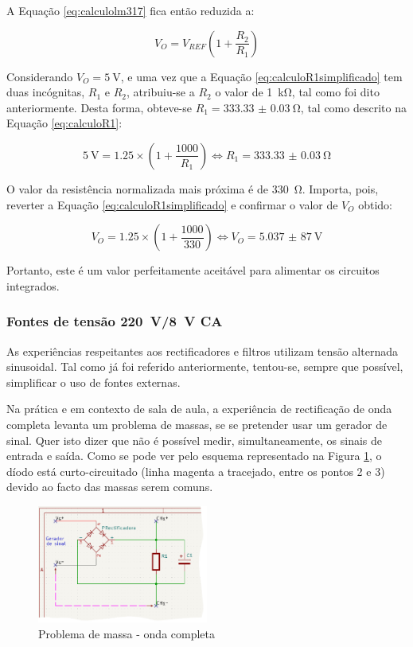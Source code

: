 A Equação \ref{eq:calculolm317} fica então reduzida a:

\begin{equation} \label{eq:calculoR1simplificado}
	V_{O} = V_{REF} (1 + \frac{R_{2}}{R_{1}})
\end{equation}

Considerando $V_{O} = \SI{5}{\volt}$, e uma vez que a Equação \ref{eq:calculoR1simplificado} tem duas incógnitas, $R_{1}$ e $R_{2}$, atribuiu-se a $R_{2}$ o valor de \SI{1}{\kilo\ohm}, tal como foi dito anteriormente. Desta forma, obteve-se $R_{1} = \SI{333.33(3)}{\ohm}$, tal como descrito na Equação \ref{eq:calculoR1}: 

\begin{equation} \label{eq:calculoR1}
	\SI{5}{\volt} = 1.25 \times (1 + \frac{1000}{R_{1}}) \Leftrightarrow R_{1} = \SI{333.33(3)}{\ohm}
\end{equation}

O valor da resistência normalizada mais próxima é de \SI{330}{\ohm}. Importa, pois, reverter a Equação \ref{eq:calculoR1simplificado} e confirmar o valor de  $V_{O}$ obtido:

\begin{equation} \label{eq:confirmacaoVout}
	V_{O} = 1.25 \times (1 + \frac{1000}{330}) \Leftrightarrow V_{O} = \SI{5,037(87)}{\volt}
\end{equation}

Portanto, este é um valor perfeitamente aceitável para alimentar os circuitos integrados.

\subsubsection{Fontes de tensão \SI{220}{\volt}/\SI{8}{\volt} CA}
\label{sec:fontealternada}
As experiências respeitantes aos rectificadores e filtros utilizam tensão alternada sinusoidal. Tal como já foi referido anteriormente, tentou-se, sempre que possível, simplificar o uso de fontes externas. 

Na prática e em contexto de sala de aula, a experiência de rectificação de onda completa levanta um problema de massas, se se pretender usar um gerador de sinal. Quer isto dizer que não é possível medir, simultaneamente, os sinais de entrada e saída. Como se pode ver pelo esquema representado na Figura \ref{fig:gerador-massa}, o díodo está curto-circuitado (linha magenta a tracejado, entre os pontos 2 e 3) devido ao facto das massas serem comuns. 

\begin{figure}[hbtp]
	\centering
	\includegraphics[width=0.5\textwidth]{figures/sch_completa_CC.png}
	\caption{Problema de massa - onda completa}
	\label{fig:gerador-massa}
\end{figure}

